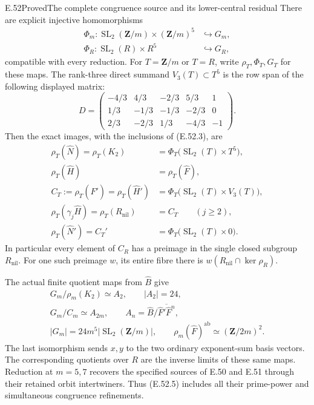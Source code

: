 \begin{statement}{E.52}{Proved}{The complete congruence source and its lower-central residual}
There are explicit injective homomorphisms
\[
 \begin{split}
 \Phi_m:\operatorname{SL}_2(\mathbf Z/m)
                    \times(\mathbf Z/m)^5&\hookrightarrow G_m,\\
 \Phi_R:\operatorname{SL}_2(R)\times R^5&\hookrightarrow G_R,
 \end{split}
 \tag{E.52.3}
\]
compatible with every reduction. For $T=\mathbf Z/m$
or $T=R$, write $\rho_T,\Phi_T,G_T$ for these maps.
The rank-three direct summand $V_3(T)\subset T^5$
is the row span of the following displayed matrix:
\[
 D=\begin{pmatrix}
 -4/3&4/3&-2/3&5/3&1\\
 1/3&-1/3&-1/3&-2/3&0\\
 2/3&-2/3&1/3&-4/3&-1
 \end{pmatrix}.
 \tag{E.52.4}
\]
Then the exact images, with the inclusions of
\textup{(E.52.3)}, are
\[
 \begin{aligned}
 \rho_T(\widehat N)=\rho_T(K_2)
     &=\Phi_T\bigl(\operatorname{SL}_2(T)\times T^5\bigr),\\
 \rho_T(\widehat H)&=\rho_T(\widehat F),\\
 C_T:=\rho_T(\widehat F')=\rho_T(\widehat H')
     &=\Phi_T\bigl(\operatorname{SL}_2(T)\times V_3(T)\bigr),\\
 \rho_T(\gamma_j\widehat H)=\rho_T(R_{\mathrm{nil}})
     &=C_T\qquad(j\geq2),\\
 \rho_T(\widehat N')=C_T'
     &=\Phi_T\bigl(\operatorname{SL}_2(T)\times0\bigr).
 \end{aligned}
 \tag{E.52.5}
\]
In particular every element of $C_R$ has a preimage in
the single closed subgroup $R_{\mathrm{nil}}$.
For one such preimage $w$, its entire fibre there is
$w(R_{\mathrm{nil}}\cap\ker\rho_R)$.

The actual finite quotient maps from $\widehat B$ give
\[
 \begin{gathered}
 G_m/\rho_m(K_2)\simeq A_2,\qquad |A_2|=24,\\
 G_m/C_m\simeq A_{2m},\qquad
 A_n=\widehat B/\overline{\widehat F'\widehat F^n},\\
 |G_m|=24m^5|\operatorname{SL}_2(\mathbf Z/m)|,\qquad
 \rho_m(\widehat F)^{\mathrm{ab}}\simeq(\mathbf Z/2m)^2.
 \end{gathered}
 \tag{E.52.6}
\]
The last isomorphism sends $x,y$ to the two ordinary
exponent-sum basis vectors. The corresponding quotients
over $R$ are the inverse limits of these same maps.
Reduction at $m=5,7$ recovers the specified sources
of E.50 and E.51 through their retained orbit
intertwiners. Thus \textup{(E.52.5)} includes all their
prime-power and simultaneous congruence refinements.
\end{statement}

